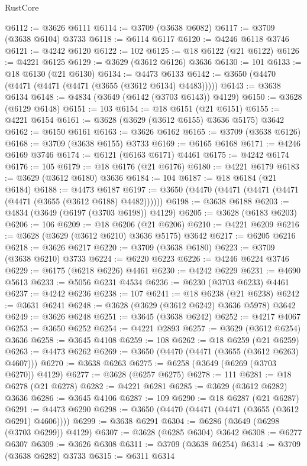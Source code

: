 \begin{lexlean}{RustCore}
\begin{coremodule}
@6112 := @3626 @6111
@6114 := @3709 (@3638 @6082)
@6117 := @3709 (@3638 @6104) @3733
@6118 := @6114 @6117
@6120 := @4246 @6118 @3746
@6121 := @4242 @6120
@6122 := 102
@6125 := @18 @6122 (@21 @6122)
@6126 := @4221 @6125
@6129 := @3629 (@3612 @6126) @3636
@6130 := 101
@6133 := @18 @6130 (@21 @6130)
@6134 := @4473 @6133
@6142 := @3650 (@4470 (@4471 (@4471 (@4471 (@3655 (@3612 @6134) @4483)))))
@6143 := @3638 @6134
@6148 := @4834 (@3649 (@6142 (@3703 @6143)) @4129)
@6150 := @3628 (@6129 @6148)
@6151 := 103
@6154 := @18 @6151 (@21 @6151)
@6155 := @4221 @6154
@6161 := @3628 (@3629 (@3612 @6155) @3636 @5175) @3642
@6162 := @6150 @6161
@6163 := @3626 @6162
@6165 := @3709 (@3638 @6126)
@6168 := @3709 (@3638 @6155) @3733
@6169 := @6165 @6168
@6171 := @4246 @6169 @3746
@6174 := @6121 (@6163 @6171) @4461
@6175 := @4242 @6174
@6176 := 105
@6179 := @18 @6176 (@21 @6176)
@6180 := @4221 @6179
@6183 := @3629 (@3612 @6180) @3636
@6184 := 104
@6187 := @18 @6184 (@21 @6184)
@6188 := @4473 @6187
@6197 := @3650 (@4470 (@4471 (@4471 (@4471 (@4471 (@3655 (@3612 @6188) @4482))))))
@6198 := @3638 @6188
@6203 := @4834 (@3649 (@6197 (@3703 @6198)) @4129)
@6205 := @3628 (@6183 @6203)
@6206 := 106
@6209 := @18 @6206 (@21 @6206)
@6210 := @4221 @6209
@6216 := @3628 (@3629 (@3612 @6210) @3636 @5175) @3642
@6217 := @6205 @6216
@6218 := @3626 @6217
@6220 := @3709 (@3638 @6180)
@6223 := @3709 (@3638 @6210) @3733
@6224 := @6220 @6223
@6226 := @4246 @6224 @3746
@6229 := @6175 (@6218 @6226) @4461
@6230 := @4242 @6229
@6231 := @4690 @5613
@6233 := @5056 @6231 @4534
@6236 := @6230 (@3703 @6233) @4461
@6237 := @4242 @6236
@6238 := 107
@6241 := @18 @6238 (@21 @6238)
@6242 := @3631 @6241
@6248 := @3628 (@3629 (@3612 @6242) @3636 @5978) @3642
@6249 := @3626 @6248
@6251 := @3645 (@3638 @6242)
@6252 := @4217 @4067
@6253 := @3650 @6252
@6254 := @4221 @2893
@6257 := @3629 (@3612 @6254) @3636
@6258 := @3645 @4108
@6259 := 108
@6262 := @18 @6259 (@21 @6259)
@6263 := @4473 @6262
@6269 := @3650 (@4470 (@4471 (@3655 (@3612 @6263) @4607)))
@6270 := @3638 @6263
@6275 := @6258 (@3649 (@6269 (@3703 @6270)) @4129)
@6277 := @3628 (@6257 @6275)
@6278 := 111
@6281 := @18 @6278 (@21 @6278)
@6282 := @4221 @6281
@6285 := @3629 (@3612 @6282) @3636
@6286 := @3645 @4106
@6287 := 109
@6290 := @18 @6287 (@21 @6287)
@6291 := @4473 @6290
@6298 := @3650 (@4470 (@4471 (@4471 (@3655 (@3612 @6291) @4606))))
@6299 := @3638 @6291
@6304 := @6286 (@3649 (@6298 (@3703 @6299)) @4129)
@6307 := @3628 (@6285 @6304) @3642
@6308 := @6277 @6307
@6309 := @3626 @6308
@6311 := @3709 (@3638 @6254)
@6314 := @3709 (@3638 @6282) @3733
@6315 := @6311 @6314

\end{coremodule}
\end{lexlean}
